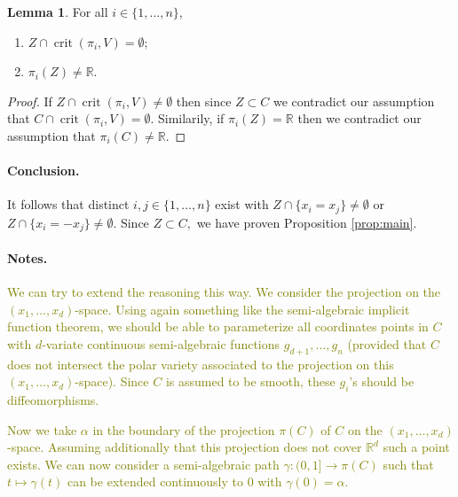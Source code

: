 \documentclass[10pt]{article}
\theoremstyle{definition}
\newtheorem{lemma}{Lemma}
\newcommand{\R}{\mathbb{R}}
\DeclareMathOperator{\crit}{crit}
\def\ms#1{\textcolor{olive}{#1}}
\begin{document}
%
%
\begin{lemma}\label{lemma:DimensionOneAssumptionsHold}
For all $i \in \{1,\hdots,n\}$, 
\begin{enumerate}
    \item $Z \cap \crit(\pi_i,V) = \emptyset$;
    \item $\pi_i(Z) \not = \R$.
\end{enumerate}
\end{lemma}
%
%
\begin{proof}
If $Z \cap \crit(\pi_i,V) \not = \emptyset$ then since $Z \subset C$ we contradict our assumption that $C \cap \crit(\pi_i,V) = \emptyset$. Similarily, if $\pi_i(Z) = \R$ then we contradict our assumption that $\pi_i(C) \not = \R.$  
\end{proof}
%









\paragraph*{Conclusion.}
It follows that distinct $i,j \in\{1,\hdots,n\}$ exist with $Z \cap \{ x_i= x_j\} \not = \emptyset$ or 
$Z \cap \{ x_i= -x_j\} \not = \emptyset.$ Since $Z \subset C,$ we have proven Proposition \ref{prop:main}.
















\paragraph*{Notes.}
\ms{We can try to extend the reasoning this way. We consider the projection on
the $(x_1, \ldots, x_d)$-space. Using again something like the semi-algebraic implicit function theorem, we should be able to parameterize all coordinates points in $C$ with $d$-variate continuous semi-algebraic functions $g_{d+1}, \ldots, g_n$ (provided that $C$ does not intersect the polar variety associated to the projection on this $(x_1, \ldots, x_d)$-space). Since $C$ is
  assumed to be smooth, these $g_i$'s should be diffeomorphisms.}

\ms{Now we take $\alpha$ in the boundary of the projection $\pi(C)$ of $C$ on
  the $(x_1, \ldots, x_d)$-space. Assuming additionally that this projection
  does not cover $\R^d$ such a point exists. We can now consider a
  semi-algebraic path $\gamma:(0, 1]\to \pi(C)$ such that $t\mapsto \gamma(t)$
  can be extended continuously to $0$ with $\gamma(0)=\alpha$. }
\end{document}
